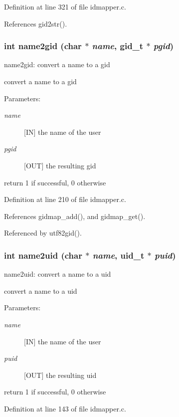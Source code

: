 Definition at line 321 of file idmapper.c.

References gid2str().
\subsubsection{\setlength{\rightskip}{0pt plus 5cm}int name2gid (char $\ast$ {\em name}, gid\_\-t $\ast$ {\em pgid})}\label{idmapper_8c_a3}


name2gid: convert a name to a gid

convert a name to a gid

\begin{Desc}
\item[Parameters:]
\begin{description}
\item[{\em name}][IN] the name of the user \item[{\em pgid}][OUT] the resulting gid\end{description}
\end{Desc}
return 1 if successful, 0 otherwise 

Definition at line 210 of file idmapper.c.

References gidmap\_\-add(), and gidmap\_\-get().

Referenced by utf82gid().
\subsubsection{\setlength{\rightskip}{0pt plus 5cm}int name2uid (char $\ast$ {\em name}, uid\_\-t $\ast$ {\em puid})}\label{idmapper_8c_a1}


name2uid: convert a name to a uid

convert a name to a uid

\begin{Desc}
\item[Parameters:]
\begin{description}
\item[{\em name}][IN] the name of the user \item[{\em puid}][OUT] the resulting uid\end{description}
\end{Desc}
return 1 if successful, 0 otherwise 

Definition at line 143 of file idmapper.c.

